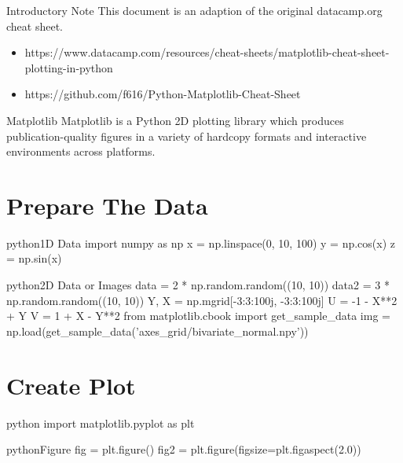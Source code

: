 \begin{alerttextbox}{Introductory Note}
This document is an adaption of the original datacamp.org cheat sheet.\\
\begin{itemize}
    \item https://www.datacamp.com/resources/cheat-sheets/matplotlib-cheat-sheet-plotting-in-python
    \item https://github.com/f616/Python-Matplotlib-Cheat-Sheet
\end{itemize}

\end{alerttextbox}


\begin{textbox}{Matplotlib}
Matplotlib is a Python 2D plotting library which produces publication-quality figures in a variety of hardcopy formats and interactive environments across platforms.
\end{textbox}


\section{Prepare The Data}

\begin{codebox}{python}{1D Data}
import numpy as np
x = np.linspace(0, 10, 100)
y = np.cos(x)
z = np.sin(x)
\end{codebox}

\begin{codebox}{python}{2D Data or Images}
data = 2 * np.random.random((10, 10))
data2 = 3 * np.random.random((10, 10))
Y, X = np.mgrid[-3:3:100j, -3:3:100j]
U = -1 - X**2 + Y
V = 1 + X - Y**2
from matplotlib.cbook import get_sample_data
img = np.load(get_sample_data('axes_grid/bivariate_normal.npy'))
\end{codebox}


\section{Create Plot}

\begin{codebox}{python}{}
import matplotlib.pyplot as plt
\end{codebox}

\begin{codebox}{python}{Figure}
fig = plt.figure()
fig2 = plt.figure(figsize=plt.figaspect(2.0))
\end{codebox}

